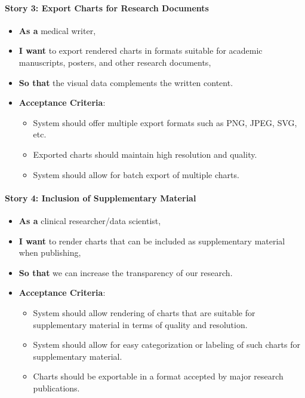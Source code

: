 \paragraph{Story 3: Export Charts for Research
Documents}\label{story-3-export-charts-for-research-documents}

\begin{itemize}
\item
  \textbf{As a} medical writer,
\item
  \textbf{I want} to export rendered charts in formats suitable for
  academic manuscripts, posters, and other research documents,
\item
  \textbf{So that} the visual data complements the written content.
\item
  \textbf{Acceptance Criteria}:

  \begin{itemize}
  \item
    System should offer multiple export formats such as PNG, JPEG, SVG,
    etc.
  \item
    Exported charts should maintain high resolution and quality.
  \item
    System should allow for batch export of multiple charts.
  \end{itemize}
\end{itemize}

\paragraph{Story 4: Inclusion of Supplementary
Material}\label{story-4-inclusion-of-supplementary-material}

\begin{itemize}
\item
  \textbf{As a} clinical researcher/data scientist,
\item
  \textbf{I want} to render charts that can be included as
  supplementary material when publishing,
\item
  \textbf{So that} we can increase the transparency of our research.
\item
  \textbf{Acceptance Criteria}:

  \begin{itemize}
  \item
    System should allow rendering of charts that are suitable for
    supplementary material in terms of quality and resolution.
  \item
    System should allow for easy categorization or labeling of such
    charts for supplementary material.
  \item
    Charts should be exportable in a format accepted by major research
    publications.
  \end{itemize}
\end{itemize}


